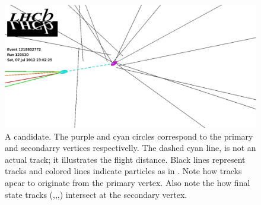 \begin{figure}[t]
  \centering
 \includegraphics[width=1\textwidth,trim=0cm 0cm 17cm 0cm, clip=true]{Figures/Chapter2/jpsikst_event.pdf}
  \caption{A \BsJpsiKst candidate. The purple and cyan circles correspond to the primary and secondarry
           vertices respectivelly. The dashed cyan line, is not an actual track; it illustrates the \Bs flight distance.
            Black lines represent \velo tracks and colored lines indicate particles as in .
            Note how \velo tracks apear to originate from the primary vertex. Also note the how \Bs final state tracks
            ({\color{green}\mmu},{\color{green}\mmu},{\color{red}\kaon},{\color{orange}\pion}) intersect at the secondary vertex.}
  \label{det_jpsikst_cand}
\end{figure}
